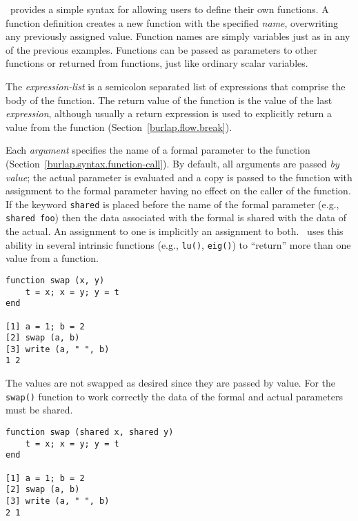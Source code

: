 \burlap\ provides a simple syntax for allowing users to define their
own functions.  A function definition creates a new function with the
specified {\it name}, overwriting any previously assigned value.
Function names are simply variables just as in any of the previous
examples.  Functions can be passed as parameters to other functions or
returned from functions, just like ordinary scalar variables.

The {\it expression-list} is a semicolon separated list of expressions
that comprise the body of the function.  The return value of the
function is the value of the last {\it expression}, although usually a
{\sc return} expression is used to explicitly return a value from the
function (Section~\ref{burlap.flow.break}).

Each {\it argument} specifies the name of a formal parameter to the
function (Section~\ref{burlap.syntax.function-call}).  By default, all
arguments are passed {\em by value}; the actual parameter is evaluated
and a copy is passed to the function with assignment to the formal
parameter having no effect on the caller of the function.  If the
keyword {\tt shared} is placed before the name of the formal parameter
(e.g., {\tt shared foo}) then the data associated with the formal is
shared with the data of the actual.  An assignment to one is
implicitly an assignment to both.  \burlap\ uses this ability in
several intrinsic functions (e.g., {\tt lu()}, {\tt eig()}) to
``return'' more than one value from a function.

\begin{screen}
\begin{verbatim}
function swap (x, y)
    t = x; x = y; y = t
end

[1] a = 1; b = 2
[2] swap (a, b)
[3] write (a, " ", b)
1 2
\end{verbatim}
\end{screen}

The values are not swapped as desired since they are passed by value.
For the {\tt swap()} function to work correctly the data of the formal
and actual parameters must be shared.

\begin{screen}
\begin{verbatim}
function swap (shared x, shared y)
    t = x; x = y; y = t
end

[1] a = 1; b = 2
[2] swap (a, b)
[3] write (a, " ", b)
2 1
\end{verbatim}
\end{screen}

